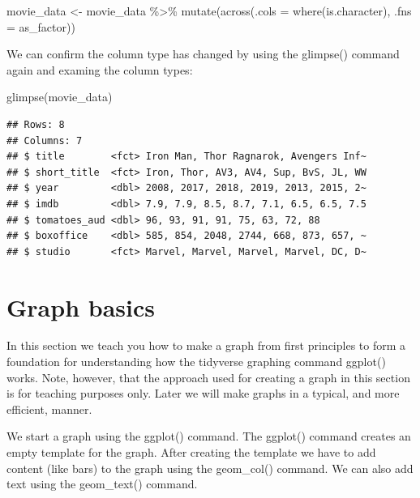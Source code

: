 \documentclass[
]{krantz}
\makeatletter
\newenvironment{Shaded}{\begin{snugshade}}{\end{snugshade}}
\newcommand{\AttributeTok}[1]{\textcolor[rgb]{0.61,0.61,0.61}{#1}}
\newcommand{\FunctionTok}[1]{\textcolor[rgb]{0,0,0}{#1}}
\newcommand{\NormalTok}[1]{#1}
\newcommand{\OtherTok}[1]{\textcolor[rgb]{0.37,0.37,0.37}{#1}}
\newcommand{\SpecialCharTok}[1]{\textcolor[rgb]{0,0,0}{#1}}
\newenvironment{kframe}{%
\medskip{}
\setlength{\fboxsep}{.8em}
 \def\at@end@of@kframe{}%
 \ifinner\ifhmode%
  \def\at@end@of@kframe{\end{minipage}}%
  \begin{minipage}{\columnwidth}%
 \fi\fi%
 \def\FrameCommand##1{\hskip\@totalleftmargin \hskip-\fboxsep
 \colorbox{shadecolor}{##1}\hskip-\fboxsep
     \hskip-\linewidth \hskip-\@totalleftmargin \hskip\columnwidth}%
 \MakeFramed {\advance\hsize-\width
   \@totalleftmargin\z@ \linewidth\hsize
   \@setminipage}}%
 {\par\unskip\endMakeFramed%
 \at@end@of@kframe}
\renewenvironment{Shaded}{\begin{kframe}}{\end{kframe}}
\makeatother
\begin{document}
\begin{Shaded}
\begin{Highlighting}[]
\NormalTok{movie\_data }\OtherTok{\textless{}{-}}\NormalTok{ movie\_data }\SpecialCharTok{\%\textgreater{}\%} 
  \FunctionTok{mutate}\NormalTok{(}\FunctionTok{across}\NormalTok{(}\AttributeTok{.cols =} \FunctionTok{where}\NormalTok{(is.character), }
                \AttributeTok{.fns =}\NormalTok{ as\_factor))}
\end{Highlighting}
\end{Shaded}

We can confirm the column type has changed by using the glimpse() command again and examing the column types:

\begin{Shaded}
\begin{Highlighting}[]
\FunctionTok{glimpse}\NormalTok{(movie\_data)}
\end{Highlighting}
\end{Shaded}

\begin{verbatim}
## Rows: 8
## Columns: 7
## $ title        <fct> Iron Man, Thor Ragnarok, Avengers Inf~
## $ short_title  <fct> Iron, Thor, AV3, AV4, Sup, BvS, JL, WW
## $ year         <dbl> 2008, 2017, 2018, 2019, 2013, 2015, 2~
## $ imdb         <dbl> 7.9, 7.9, 8.5, 8.7, 7.1, 6.5, 6.5, 7.5
## $ tomatoes_aud <dbl> 96, 93, 91, 91, 75, 63, 72, 88
## $ boxoffice    <dbl> 585, 854, 2048, 2744, 668, 873, 657, ~
## $ studio       <fct> Marvel, Marvel, Marvel, Marvel, DC, D~
\end{verbatim}

\hypertarget{graph-basics}{%
\section{Graph basics}\label{graph-basics}}

In this section we teach you how to make a graph from first principles to form a foundation for understanding how the tidyverse graphing command ggplot() works. Note, however, that the approach used for creating a graph in this section is for teaching purposes only. Later we will make graphs in a typical, and more efficient, manner.

We start a graph using the ggplot() command. The ggplot() command creates an empty template for the graph. After creating the template we have to add content (like bars) to the graph using the geom\_col() command. We can also add text using the geom\_text() command.
\end{document}
